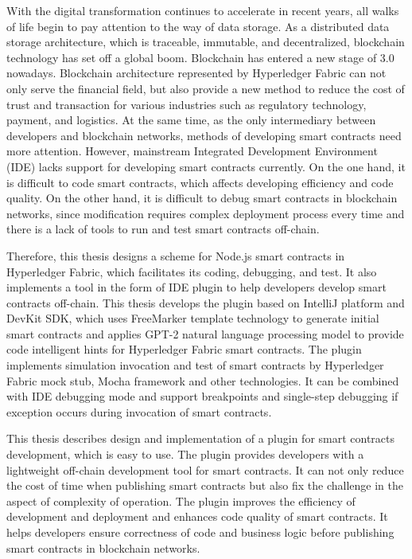 \documentclass[winfonts,master,twoside]{njuthesis}
\begin{document}
\begin{englishabstract}
	With the digital transformation continues to accelerate in recent years, all walks of life begin to pay attention to the way of data storage. 
	As a distributed data storage architecture, which is traceable, immutable, and decentralized, blockchain technology has set off a global boom. 
	Blockchain has entered a new stage of 3.0 nowadays. 
	Blockchain architecture represented by Hyperledger Fabric can not only serve the financial field, but also provide a new method to reduce the cost of trust and transaction for various industries such as regulatory technology, payment, and logistics. 
	At the same time, as the only intermediary between developers and blockchain networks, methods of developing smart contracts need more attention. 
	However, mainstream Integrated Development Environment (IDE) lacks support for developing smart contracts currently. 
	On the one hand, it is difficult to code smart contracts, which affects developing efficiency and code quality. 
    On the other hand, it is difficult to debug smart contracts in blockchain networks, since modification requires complex deployment process every time and there is a lack of tools to run and test smart contracts off-chain.
	
	Therefore, this thesis designs a scheme for Node.js smart contracts in Hyperledger Fabric, which facilitates its coding, debugging, and test. 
	It also implements a tool in the form of IDE plugin to help developers develop smart contracts off-chain. 
	This thesis develops the plugin based on IntelliJ platform and DevKit SDK, 
	which uses FreeMarker template technology to generate initial smart contracts and applies GPT-2 natural language processing model to provide code intelligent hints for Hyperledger Fabric smart contracts.
	The plugin implements simulation invocation and test of smart contracts by Hyperledger Fabric mock stub, Mocha framework and other technologies.
	It can be combined with IDE debugging mode and support breakpoints and single-step debugging if exception occurs during invocation of smart contracts.
	
	This thesis describes design and implementation of a plugin for smart contracts development, which is easy to use. 
	The plugin provides developers with a lightweight off-chain development tool for smart contracts. 
	It can not only reduce the cost of time when publishing smart contracts but also fix the challenge in the aspect of complexity of operation.
	The plugin improves the efficiency of development and deployment and enhances code quality of smart contracts. 
	It helps developers ensure correctness of code and business logic before publishing smart contracts in blockchain networks.
	
\end{englishabstract}
\end{document}
